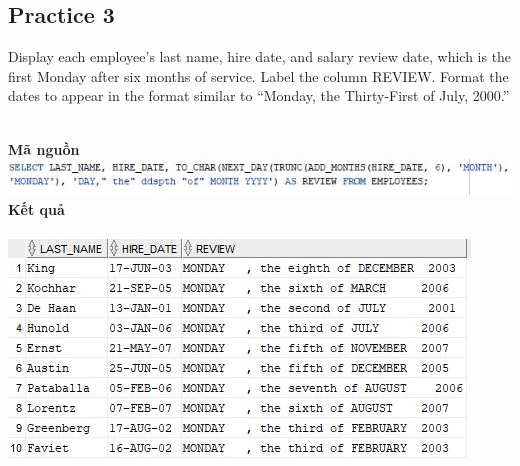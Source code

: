 \documentclass[12pt,a4paper]{report}
\begin{document}
\subsection{Practice 3}
\begin{boxedminipage}[t]{15.5cm}
	Display each employee’s last name, hire date, and salary review date, 
	which is the first Monday after six months of service. Label the column REVIEW. 
	Format the dates to appear in the format similar to “Monday, the Thirty-First of July, 2000.”
\end{boxedminipage}
\newline
\\
\textbf{Mã nguồn}
\\
\newline
\includegraphics[scale=.95]{35.jpg}\\
\textbf{Kết quả}\\\\
\includegraphics[scale=1]{k35.jpg}
\end{document}
